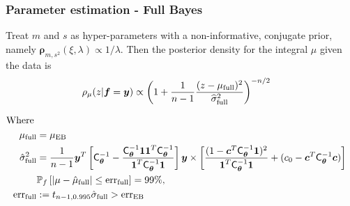 \documentclass[handout, 10pt,compress,xcolor={usenames,dvipsnames}]{beamer} %
\newcommand{\bm}[1]{\boldsymbol{#1}}
\newcommand{\MLE}{\textup{EB}}
\newcommand{\full}{\textup{full}}
\newcommand{\mCthetaInv}{{\mathsf{C}^{-1}_{\vtheta}}}
\newcommand{\D}[1]{\text{d}{#1}}
\newcommand{\vrho}{\bm{\rho}}
\newcommand{\err}{{\text{err}}}
\renewcommand{\vtheta}{{\bm{\theta}}}
\newcommand{\pause}{}
\begin{document}
\begin{frame}
	\frametitle{Parameter estimation - Full Bayes}
	\vspace*{-6ex}
	Treat $m$ and $s$ as hyper-parameters with a non-informative, conjugate prior, namely $\vrho_{m,s^2}(\xi, \lambda) \propto 1/\lambda$.
	Then the posterior density for the integral $\mu$ given the data is
	\vspace*{-2.0ex}
	\begin{align*}
	\rho_{\mu}(z | \vf = \vy) 
	& \propto \left(1 +  \frac{1}{n-1} \frac{(z - \mu_{\full})^2}{\widehat{\sigma}_{\full}^2} \right)^{-n/2}
	\end{align*}
	\pause
	\vspace{-4ex}
	\begin{align*}
	\text{Where} \;
	\\
	\mu_{\full} &= \mu_\MLE
	\\
	\hsigma^2_{\full} 
	& = \frac{1}{n-1}
	\vy^T\left[ \mCthetaInv 
	- \frac{ \mCthetaInv \vone\vone^T \mCthetaInv}{\vone^T \mCthetaInv \vone}  \right]\vy
	\times  \left[\frac{(1 - \vc^T \mCthetaInv \vone)^2}{\vone^T \mCthetaInv \vone} + (c_0  -\vc ^T \mCthetaInv \vc) \right]
	\\ &\mathbb{P}_f \left[ |\mu-\hmu_{\full}|  \leq \err_{\full} \right]  = 99\%,
	\\ \err_{\full} &:= t_{n-1,0.995} \hat{\sigma}_{\full} > \err_{\MLE}
	\end{align*}
\end{frame}
























\end{document}
